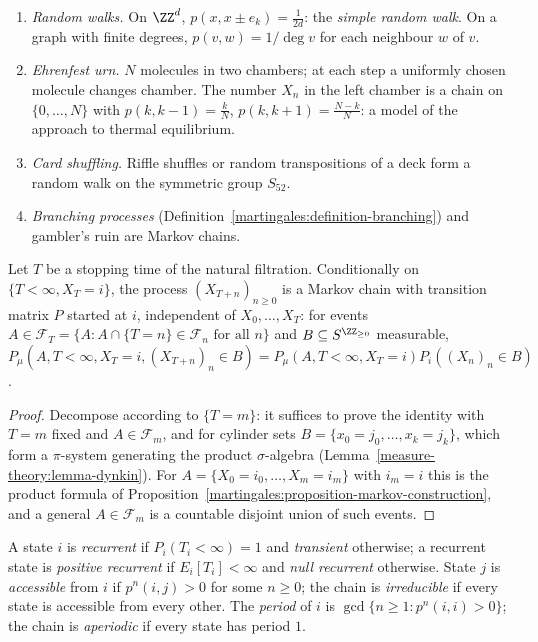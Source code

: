 \begin{example}\label{martingales:example-markov-chains}
\begin{enumerate}
\item \emph{Random walks.} On $\ZZ^d$, $p(x, x \pm e_k) = \frac{1}{2d}$: the \emph{simple random walk}. On a graph with finite degrees, $p(v, w) = 1/\deg v$ for each neighbour $w$ of $v$.
\item \emph{Ehrenfest urn.} $N$ molecules in two chambers; at each step a uniformly chosen molecule changes chamber. The number $X_n$ in the left chamber is a chain on $\{0, \ldots, N\}$ with $p(k, k - 1) = \frac kN$,
$p(k, k + 1) = \frac{N - k}{N}$: a model of the approach to thermal equilibrium.
\item \emph{Card shuffling.} Riffle shuffles or random transpositions of a deck form a random walk on the symmetric group $S_{52}$.
\item \emph{Branching processes} (Definition~\ref{martingales:definition-branching}) and gambler's ruin are Markov chains.
\end{enumerate}
\end{example}

\begin{proposition}\label{martingales:proposition-strong-markov}
Let $T$ be a stopping time of the natural filtration. Conditionally on $\{T < \infty, X_T = i\}$, the process $(X_{T+n})_{n \geq 0}$ is a Markov chain with transition matrix $P$ started at $i$, independent of
$X_0, \ldots, X_T$: for events $A \in \mathcal{F}_T = \{A : A \cap \{T = n\} \in \mathcal{F}_n \text{ for all } n\}$ and $B \subseteq S^{\ZZ_{\geq 0}}$ measurable,
$P_\mu(A, T < \infty, X_T = i, (X_{T+n})_n \in B) = P_\mu(A, T < \infty, X_T = i)P_i((X_n)_n \in B)$.
\end{proposition}

\begin{proof}
Decompose according to $\{T = m\}$: it suffices to prove the identity with $T = m$ fixed and $A \in \mathcal{F}_m$, and for cylinder sets $B = \{x_0 = j_0, \ldots, x_k = j_k\}$, which form a $\pi$-system generating the product
$\sigma$-algebra (Lemma~\ref{measure-theory:lemma-dynkin}). For $A = \{X_0 = i_0, \ldots, X_m = i_m\}$ with $i_m = i$ this is the product formula of Proposition~\ref{martingales:proposition-markov-construction}, and a general
$A \in \mathcal{F}_m$ is a countable disjoint union of such events.
\end{proof}

\begin{definition}\label{martingales:definition-recurrence}
A state $i$ is \emph{recurrent} if $P_i(T_i < \infty) = 1$ and \emph{transient} otherwise; a recurrent state is \emph{positive recurrent} if $E_i[T_i] < \infty$ and \emph{null recurrent} otherwise. State $j$ is
\emph{accessible} from $i$ if $p^n(i, j) > 0$ for some $n \geq 0$; the chain is \emph{irreducible} if every state is accessible from every other. The \emph{period} of $i$ is $\gcd\{n \geq 1 : p^n(i, i) > 0\}$; the chain is
\emph{aperiodic} if every state has period $1$.
\end{definition}


